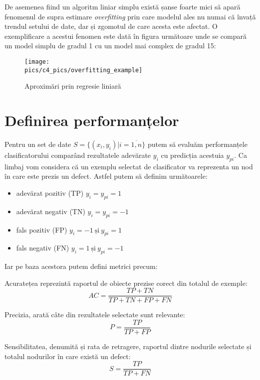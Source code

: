 De asemenea fiind un algoritm liniar simplu există șanse foarte mici să apară fenomenul de supra estimare \textit{overfitting} prin care modelul ales nu numai că învață trendul setului de date, dar și zgomotul de care acesta este afectat. O exemplificare a acestui fenomen este dată în figura următoare unde se compară un model simplu de gradul 1 cu un model mai complex de gradul 15:

\begin{figure}[H]
\centering
\texttt{[image: \\pics/c4\_pics/overfitting\_example]}
\caption{Aproximări prin regresie liniară}
\label{fig:svm_hiper}
\end{figure}

\section{Definirea performanțelor}
Pentru un set de date $S = \{(x_i, y_i) | i = \overline{1,n}\}$ putem să evaluăm performanțele clasificatorului comparând rezultatele adevărate $y_i$ cu predicția acestuia $y_{pi}$. Ca limbaj vom considera că un exemplu selectat de clasificator va reprezenta un nod în care este prezis un defect. Astfel putem să definim următoarele:
\begin{itemize}
    \item adevărat pozitiv (TP) $y_i = y_{pi} = 1$
    \item adevărat negativ (TN) $y_i = y_{pi} = -1$
    \item fals pozitiv (FP) $y_i = -1 ~\text{și}~ y_{pi} = 1$
    \item fals negativ (FN) $y_i = 1 ~\text{și}~ y_{pi} = -1$
\end{itemize}

Iar pe baza acestora putem defini metrici precum:

Acuratețea reprezintă raportul de obiecte prezise corect din totalul de exemple:
\begin{equation}
    AC = \frac{TP + TN}{TP + TN + FP + FN}
\end{equation}

Precizia, arată câte din rezultatele selectate sunt relevante:
\begin{equation}
    P = \frac{TP}{TP + FP}
\end{equation}

Sensibilitatea, denumită și rata de retragere, raportul dintre nodurile selectate și totalul nodurilor în care există un defect:
\begin{equation}
    S = \frac{TP}{TP + FN}
\end{equation}


